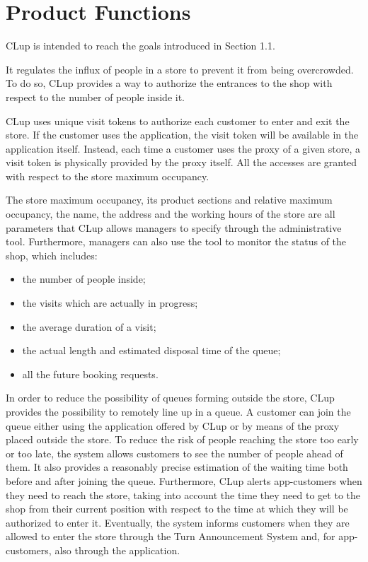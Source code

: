 \documentclass[a4paper,oneside,11pt]{book}   %
\begin{document}
    \section{Product Functions}
    CLup is intended to reach the goals introduced in Section 1.1. \par
    It regulates the influx of people in a store to prevent it from being overcrowded. To do so, CLup provides a way to authorize the entrances to the shop with respect to the number of people inside it. \par
    CLup uses unique visit tokens to authorize each customer to enter and exit the store. If the customer uses the application, the visit token will be available in the application itself. Instead, each time a customer uses the proxy of a given store, a visit token is physically provided by the proxy itself. All the accesses are granted with respect to the store maximum occupancy. \par
    The store maximum occupancy, its product sections and relative maximum occupancy, the name, the address and the working hours of the store are all parameters that CLup allows managers to specify through the administrative tool. Furthermore, managers can also use the tool to monitor the status of the shop, which includes:
    \begin{itemize}
        \item the number of people inside;
        \item the visits which are actually in progress;
        \item the average duration of a visit;
        \item the actual length and estimated disposal time of the queue;
        \item all the future booking requests.
    \end{itemize}
    In order to reduce the possibility of queues forming outside the store, CLup provides the possibility to remotely line up in a queue. A customer can join the queue either using the application offered by CLup or by means of the proxy placed outside the store. To reduce the risk of people reaching the store too early or too late, the system allows customers to see the number of people ahead of them. It also provides a reasonably precise estimation of the waiting time both before and after joining the queue. Furthermore, CLup alerts app-customers when they need to reach the store, taking into account the time they need to get to the shop from their current position with respect to the time at which they will be authorized to enter it. Eventually, the system informs customers when they are allowed to enter the store through the Turn Announcement System and, for app-customers, also through the application. \par
\end{document}
